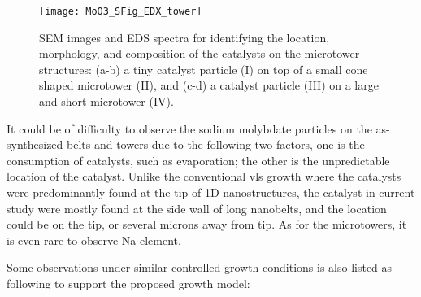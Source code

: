 \begin{figure}[htb]
\centering
\texttt{[image: MoO3\_SFig\_EDX\_tower]}
\caption[SEM images and EDS spectra for identifying the location, morphology, and composition of the catalysts on the microtower structures]{SEM images and EDS spectra for identifying the location, morphology, and composition of the catalysts on the microtower structures: (a-b) a tiny catalyst particle (I) on top of a small cone shaped microtower (II), and (c-d) a catalyst particle (III) on a large and short microtower (IV).}
\label{fig:ch4edx2}
\end{figure}
It could be of difficulty to observe the sodium molybdate particles on the as-synthesized belts and towers due to the following two factors, one is the consumption of catalysts, such as evaporation; the other is the unpredictable location of the catalyst. Unlike the conventional \gls{vls} growth where the catalysts were predominantly found at the tip of 1D nanostructures, the catalyst in current study were mostly found at the side wall of long nanobelts, and the location could be on the tip, or several microns away from tip. As for the microtowers, it is even rare to observe Na element.

Some observations under similar controlled growth conditions is also listed as following to support the proposed growth model: 

